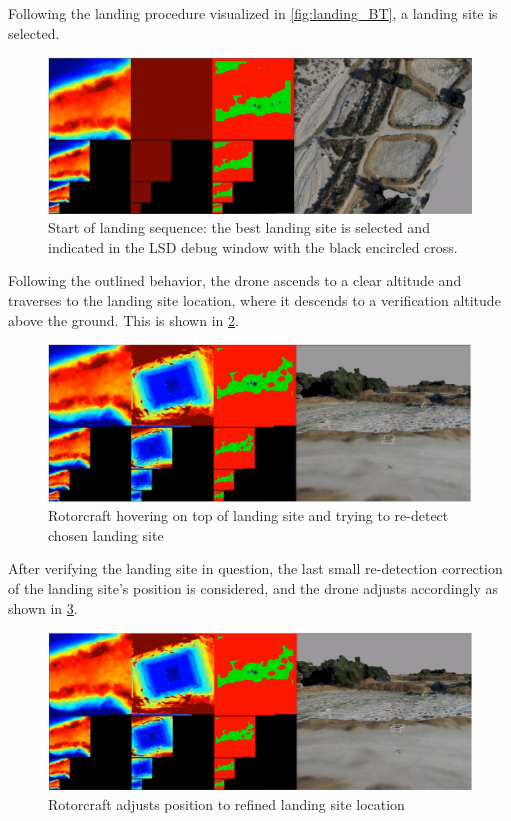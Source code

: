 Following the landing procedure visualized in \cref{fig:landing_BT}, a landing site is selected. 

\begin{figure}[h]
\centering
\includegraphics[scale=0.25]{images/autonomous_landing/demo_flight/ls_selection.png}
\caption{Start of landing sequence: the best landing site is selected and indicated in the LSD debug window with the black encircled cross.}
\label{fig:demo_ls_selection}
\end{figure}

Following the outlined behavior, the drone ascends to a clear altitude and traverses to the landing site location, where it descends to a verification altitude above the ground. This is shown in \cref{fig:demo_ver}.

\begin{figure}[h]
\centering
\includegraphics[scale=0.25]{images/autonomous_landing/demo_flight/verification.png}
\caption{Rotorcraft hovering on top of landing site and trying to re-detect chosen landing site}
\label{fig:demo_ver}
\end{figure}

After verifying the landing site in question, the last small re-detection correction of the landing site's position is considered, and the drone adjusts accordingly as shown in \cref{fig:demo_last_correction}.

\begin{figure}[h]
\centering
\includegraphics[scale=0.25]{images/autonomous_landing/demo_flight/last_correction.png}
\caption{Rotorcraft adjusts position to refined landing site location}
\label{fig:demo_last_correction}
\end{figure}
\clearpage%
